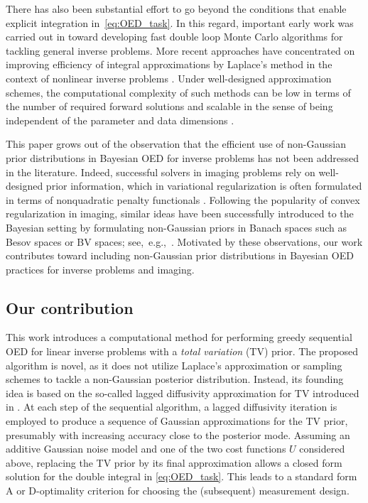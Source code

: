 \documentclass[final]{siamltex}
\begin{document}
There has also been substantial effort to go beyond the conditions that enable explicit integration in~\eqref{eq:OED_task}. In this regard, important early work was carried out in \cite{ryan2003estimating, huan2010accelerated, huan2013simulation} toward developing fast double loop Monte Carlo algorithms for tackling general inverse problems. More recent approaches have concentrated on improving efficiency of integral approximations by Laplace's method in the context of nonlinear inverse problems \cite{long2013fast, alexanderian2016fast, crestel2017optimal, beck2018fast}. Under well-designed approximation schemes, the computational complexity of such methods can be low in terms of the number of required forward solutions and scalable in the sense of being independent of the parameter and data dimensions \cite{wu2020fast, wu2021fast}.

This paper grows out of the observation that the efficient use of non-Gaussian prior distributions in Bayesian OED for inverse problems has not been addressed in the literature. Indeed, successful solvers in imaging problems rely on well-designed prior information, which in variational regularization is often formulated in terms of nonquadratic penalty functionals \cite{scherzer2009variational}.
Following the popularity of convex regularization in imaging, similar ideas have been successfully introduced to the Bayesian setting by formulating non-Gaussian priors in Banach spaces such as Besov spaces or BV spaces; see,~e.g.,~\cite{wang2017bayesian, yao2016tv, vanska2009statistical, Lassas2009, agapiou2018sparsity, agapiou2018rates, lv2020nonlocal}. Motivated by these observations, our work contributes toward including non-Gaussian prior distributions in Bayesian OED practices for inverse problems and imaging.

\subsection{Our contribution}
This work introduces a computational method for performing greedy sequential OED for linear inverse problems with a {\em total variation} (TV) prior. The proposed algorithm is novel, as it does not utilize Laplace's approximation or sampling schemes to tackle a non-Gaussian posterior distribution. Instead, its founding idea is based on the so-called lagged diffusivity approximation for TV introduced in \cite{Vogel96}. At each step of the sequential algorithm, a lagged diffusivity iteration is employed to produce a sequence of Gaussian approximations for the TV prior, presumably with increasing accuracy close to the posterior mode. Assuming an additive Gaussian noise model and one of the two cost functions $U$ considered above, replacing the TV prior by its final approximation allows a closed form solution for the double integral in \eqref{eq:OED_task}. This leads to a standard form A or D-optimality criterion for choosing the (subsequent) measurement design.
\end{document}
